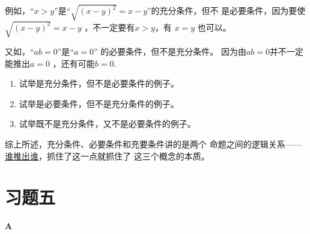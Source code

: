 例如，“$x>y$”是“$\sqrt{(x-y)^2}=x-y$”的充分条件，但不
是必要条件，因为要使$\sqrt{(x-y)^2}=x-y$
，不一定要有$x>y$，有
$x=y$
也可以。

又如，“$ab=0$”是“$a=0$”
的必要条件，但不是充分条件。
因为由$ab=0$并不一定能推出$a=0$
，还有可能$b=0$.

\begin{blk}
\begin{enumerate}[(1)]
\item 试举是充分条件，但不是必要条件的例子。
\item 试举是必要条件，但不是充分条件的例子。
\item 试举既不是充分条件，又不是必要条件的例子。
\end{enumerate}
\end{blk}

综上所述，充分条件、必要条件和充要条件讲的是两个
命题之间的逻辑关系——\underline{谁推出谁}，抓住了这一点就抓住了
这三个概念的本质。

\section*{习题五}
\begin{center}
    \bfseries A
\end{center}

